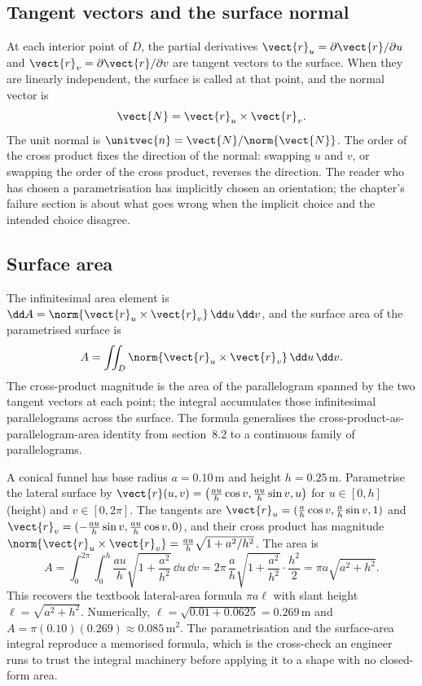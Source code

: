 \subsection{Tangent vectors and the surface normal}

At each interior point of $D$, the partial derivatives
$\vect{r}_{u} = \partial\vect{r}/\partial u$ and $\vect{r}_{v} =
\partial\vect{r}/\partial v$ are tangent vectors to the surface. When
they are linearly independent, the surface is called 
at that point, and the normal vector is
\[
\vect{N} = \vect{r}_{u} \times \vect{r}_{v}.
\]
The unit normal is $\unitvec{n} = \vect{N} / \norm{\vect{N}}$. The
order of the cross product fixes the direction of the normal: swapping
$u$ and $v$, or swapping the order of the cross product, reverses
the direction. The reader who has chosen a parametrisation has
implicitly chosen an orientation; the chapter's failure section is
about what goes wrong when the implicit choice and the intended
choice disagree.

\subsection{Surface area}

The infinitesimal area element is $\dd A = \norm{\vect{r}_{u} \times
\vect{r}_{v}} \,\dd u \,\dd v$, and the surface area of the
parametrised surface is
\[
A = \iint_{D} \norm{\vect{r}_{u} \times \vect{r}_{v}} \,\dd u \,\dd v.
\]
The cross-product magnitude is the area of the parallelogram spanned
by the two tangent vectors at each point; the integral accumulates
those infinitesimal parallelograms across the surface. The formula
generalises the cross-product-as-parallelogram-area identity from
section~8.2 to a continuous family of parallelograms.

\begin{example}
A conical funnel has base radius $a = 0.10\,\si{\meter}$ and height
$h = 0.25\,\si{\meter}$. Parametrise the lateral surface by
$\vect{r}(u, v) = \big(\tfrac{a u}{h}\cos v, \tfrac{a u}{h}\sin v,
u\big)$ for $u \in [0, h]$ (height) and $v \in [0, 2\pi]$. The
tangents are $\vect{r}_{u} = (\tfrac{a}{h}\cos v, \tfrac{a}{h}\sin v,
1)$ and $\vect{r}_{v} = (-\tfrac{a u}{h}\sin v, \tfrac{a u}{h}\cos v,
0)$, and their cross product has magnitude $\norm{\vect{r}_{u}\times
\vect{r}_{v}} = \tfrac{a u}{h}\sqrt{1 + a^{2}/h^{2}}$. The area is
\[
A = \int_{0}^{2\pi}\!\int_{0}^{h}\frac{a u}{h}\sqrt{1 + \frac{a^{2}}
{h^{2}}}\,\dd u\,\dd v = 2\pi\,\frac{a}{h}\sqrt{1 + \frac{a^{2}}{h^{2}}}
\cdot\frac{h^{2}}{2} = \pi a\sqrt{a^{2} + h^{2}}.
\]
This recovers the textbook lateral-area formula $\pi a \ell$ with slant
height $\ell = \sqrt{a^{2} + h^{2}}$. Numerically, $\ell = \sqrt{0.01
+ 0.0625} = 0.269\,\si{\meter}$ and $A = \pi(0.10)(0.269) \approx
0.085\,\si{\meter\squared}$. The parametrisation and the surface-area
integral reproduce a memorised formula, which is the cross-check an
engineer runs to trust the integral machinery before applying it to a
shape with no closed-form area.
\end{example}

